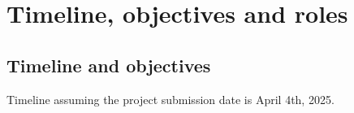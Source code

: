 \documentclass{article}
\begin{document}
\section{Timeline, objectives and roles}


\subsection{Timeline and objectives}
Timeline assuming the project submission date is April 4th, 2025.
\end{document}
